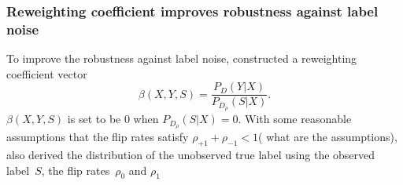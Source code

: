 \documentclass[12pt]{article} %
\newcommand{\rhoo}{\rho_{+1}}
\newcommand{\rhoz}{\rho_{-1}}
\begin{document}
\subsubsection{Reweighting coefficient improves robustness against label noise}
To improve the robustness against label noise, \citet{liu2016classification} constructed a reweighting coefficient vector~
\begin{equation}
\beta(X,Y,S)=\frac{P_D(Y|X)}{P_{D_\rho}(S|X)}. \label{beta}
\end{equation}
$\beta(X,Y,S)$ is set to be $0$ when $P_{D_\rho}(S|X)=0$.
With some reasonable assumptions that the flip rates satisfy $\rhoo+\rhoz<1$({\color{red} what are the assumptions}), \citet{liu2016classification} also derived the distribution of the unobserved  true label using the observed label~$S$, the flip rates~$\rho_{0}$ and $\rho_{1}$
\end{document}
